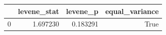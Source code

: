 \begin{tabular}{lrrr}
\toprule
 & levene_stat & levene_p & equal_variance \\
\midrule
0 & 1.697230 & 0.183291 & True \\
\bottomrule
\end{tabular}
